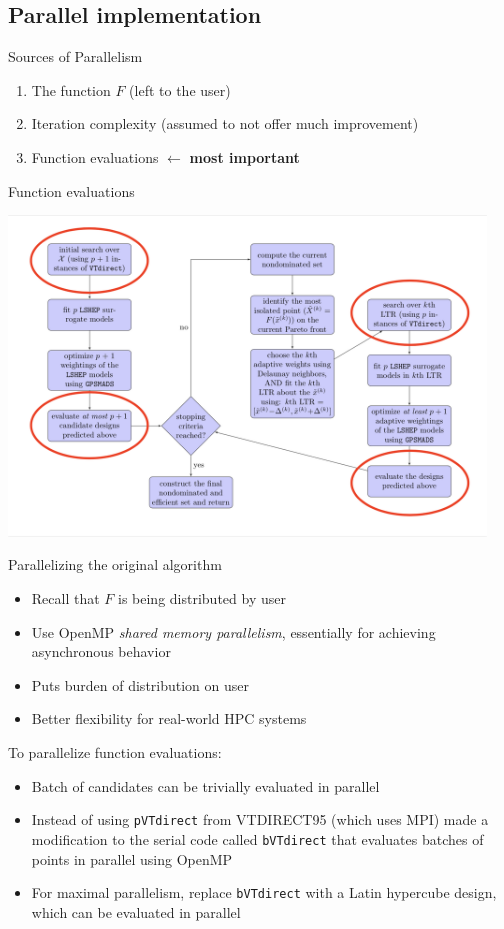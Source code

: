 \documentclass[xcolor=dvipsnames]{beamer}
\begin{document}
\subsection{Parallel implementation}
\begin{frame}{Sources of Parallelism}
\begin{enumerate}
\item The function $F$ (left to the user)
\item Iteration complexity (assumed to not offer much improvement)
\item Function evaluations $\leftarrow$ {\bf most important}
\end{enumerate}
\end{frame}
\begin{frame}{Function evaluations}
\begin{center}
\includegraphics[width=0.95\textwidth]{eval-chart.png}
\end{center}
\end{frame}
\begin{frame}{Parallelizing the original algorithm}
\begin{itemize}
\item Recall that $F$ is being distributed by user
\item Use OpenMP {\it shared memory parallelism}, essentially for achieving
asynchronous behavior
\item Puts burden of distribution on user
\item Better flexibility for real-world HPC systems
\end{itemize}
\medskip\pause
To parallelize function evaluations:
\begin{itemize}
\item Batch of candidates can be trivially evaluated in parallel
\item Instead of using {\tt pVTdirect} from VTDIRECT95 (which uses MPI)
made a modification to the serial code called {\tt bVTdirect} that evaluates
batches of points in parallel using OpenMP
\item For maximal parallelism, replace {\tt bVTdirect} with a Latin hypercube
design, which can be evaluated in parallel
\end{itemize}
\end{frame}
\end{document}
